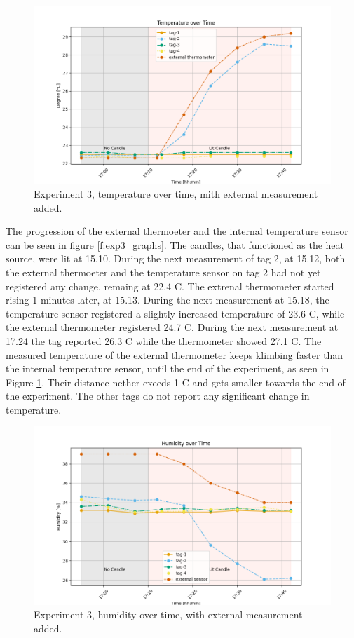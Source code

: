 \begin{figure}[ht!]
	\includegraphics[width=\linewidth]{graphics/exp/exp3_temp_plot_1.png}
	\caption{Experiment 3, temperature over time, mith external measurement added.}
	\label{f:exp3_graphs_temp}
\end{figure}

The progression of the external thermoeter and the internal temperature sensor can be seen in figure \ref{f:exp3_graphs}.
The candles, that functioned as the heat source, were lit at 15.10.
During the next measurement of tag 2, at 15.12, both the external thermoeter and the temperature sensor on tag 2 had not yet registered any change, remaing at 22.4 \degree C.
The extrenal thermometer started rising 1 minutes later, at 15.13.
During the next measurement at 15.18, the temperature-sensor registered a slightly increased temperature of 23.6 \degree C, while the external thermometer registered 24.7 \degree C.
During the next measurement at 17.24 the tag reported 26.3 \degree C while the thermometer showed 27.1 \degree C. 
The measured temperature of the external thermometer keeps klimbing faster than the internal temperature sensor, until the end of the experiment, as seen in Figure \ref{f:exp3_graphs_temp}.
Their distance nether exeeds 1 \degree C and gets smaller towards the end of the experiment.
The other tags do not report any significant change in temperature.

\begin{figure}[ht!]
	\includegraphics[width=\linewidth]{graphics/exp/exp3_hum_plot_1.png}
	\caption{Experiment 3, humidity over time, with external measurement added.}
	\label{f:exp3_graphs_hum}
\end{figure}


